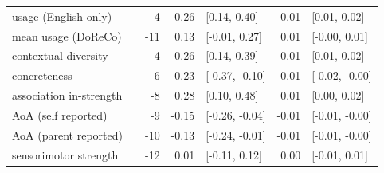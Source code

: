 \begin{table}[ht]
\begin{tabular}{llrrlrl}
  usage (English only) &  & -4 & 0.26 & [0.14, 0.40] & 0.01 & [0.01, 0.02] \\ 
  mean usage (DoReCo) &  & -11 & 0.13 & [-0.01, 0.27] & 0.01 & [-0.00, 0.01] \\ 
  contextual diversity &  & -4 & 0.26 & [0.14, 0.39] & 0.01 & [0.01, 0.02] \\ 
  concreteness &  & -6 & -0.23 & [-0.37, -0.10] & -0.01 & [-0.02, -0.00] \\ 
  association in-strength &  & -8 & 0.28 & [0.10, 0.48] & 0.01 & [0.00, 0.02] \\ 
  AoA (self reported) &  & -9 & -0.15 & [-0.26, -0.04] & -0.01 & [-0.01, -0.00] \\ 
  AoA (parent reported) &  & -10 & -0.13 & [-0.24, -0.01] & -0.01 & [-0.01, -0.00] \\ 
  sensorimotor strength &  & -12 & 0.01 & [-0.11, 0.12] & 0.00 & [-0.01, 0.01] \\ 
   \hline
\end{tabular}
\end{table}

